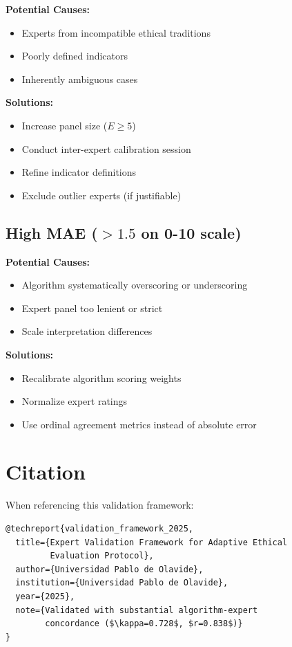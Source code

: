\documentclass[11pt]{article}
\begin{document}
\textbf{Potential Causes:}
\begin{itemize}[noitemsep]
    \item Experts from incompatible ethical traditions
    \item Poorly defined indicators
    \item Inherently ambiguous cases
\end{itemize}

\textbf{Solutions:}
\begin{itemize}[noitemsep]
    \item Increase panel size ($E \geq 5$)
    \item Conduct inter-expert calibration session
    \item Refine indicator definitions
    \item Exclude outlier experts (if justifiable)
\end{itemize}

\subsection{High MAE ($> 1.5$ on 0-10 scale)}

\textbf{Potential Causes:}
\begin{itemize}[noitemsep]
    \item Algorithm systematically overscoring or underscoring
    \item Expert panel too lenient or strict
    \item Scale interpretation differences
\end{itemize}

\textbf{Solutions:}
\begin{itemize}[noitemsep]
    \item Recalibrate algorithm scoring weights
    \item Normalize expert ratings
    \item Use ordinal agreement metrics instead of absolute error
\end{itemize}

\section{Citation}

When referencing this validation framework:

\begin{verbatim}
@techreport{validation_framework_2025,
  title={Expert Validation Framework for Adaptive Ethical
         Evaluation Protocol},
  author={Universidad Pablo de Olavide},
  institution={Universidad Pablo de Olavide},
  year={2025},
  note={Validated with substantial algorithm-expert
        concordance ($\kappa=0.728$, $r=0.838$)}
}
\end{verbatim}
\end{document}

